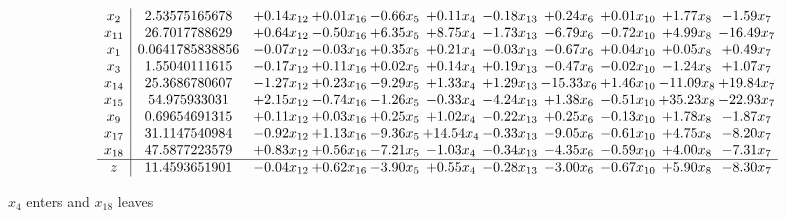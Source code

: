 \documentclass[9pt]{article}
\begin{document}
 \[\begin{array}{c| c c@{\hskip 2pt} c@{\hskip 2pt} c@{\hskip 2pt} c@{\hskip 2pt} c@{\hskip 2pt} c@{\hskip 2pt} c@{\hskip 2pt} c@{\hskip 2pt} c@{\hskip 2pt} }
 x_{2}   &  2.53575165678 & +  0.14 x_{12} & +  0.01 x_{16} & -0.66 x_{5} & +  0.11 x_{4} & -0.18 x_{13} & +  0.24 x_{6} & +  0.01 x_{10} & +  1.77 x_{8} & -1.59 x_{7}\\
 x_{11}   &  26.7017788629 & +  0.64 x_{12} & -0.50 x_{16} & +  6.35 x_{5} & +  8.75 x_{4} & -1.73 x_{13} & -6.79 x_{6} & -0.72 x_{10} & +  4.99 x_{8} & -16.49 x_{7}\\
 x_{1}   &  0.0641785838856 & -0.07 x_{12} & -0.03 x_{16} & +  0.35 x_{5} & +  0.21 x_{4} & -0.03 x_{13} & -0.67 x_{6} & +  0.04 x_{10} & +  0.05 x_{8} & +  0.49 x_{7}\\
 x_{3}   &  1.55040111615 & -0.17 x_{12} & +  0.11 x_{16} & +  0.02 x_{5} & +  0.14 x_{4} & +  0.19 x_{13} & -0.47 x_{6} & -0.02 x_{10} & -1.24 x_{8} & +  1.07 x_{7}\\
 x_{14}   &  25.3686780607 & -1.27 x_{12} & +  0.23 x_{16} & -9.29 x_{5} & +  1.33 x_{4} & +  1.29 x_{13} & -15.33 x_{6} & +  1.46 x_{10} & -11.09 x_{8} & + 19.84 x_{7}\\
 x_{15}   &  54.975933031 & +  2.15 x_{12} & -0.74 x_{16} & -1.26 x_{5} & -0.33 x_{4} & -4.24 x_{13} & +  1.38 x_{6} & -0.51 x_{10} & + 35.23 x_{8} & -22.93 x_{7}\\
 x_{9}   &  0.69654691315 & +  0.11 x_{12} & +  0.03 x_{16} & +  0.25 x_{5} & +  1.02 x_{4} & -0.22 x_{13} & +  0.25 x_{6} & -0.13 x_{10} & +  1.78 x_{8} & -1.87 x_{7}\\
 x_{17}   &  31.1147540984 & -0.92 x_{12} & +  1.13 x_{16} & -9.36 x_{5} & + 14.54 x_{4} & -0.33 x_{13} & -9.05 x_{6} & -0.61 x_{10} & +  4.75 x_{8} & -8.20 x_{7}\\
 x_{18}   &  47.5877223579 & +  0.83 x_{12} & +  0.56 x_{16} & -7.21 x_{5} & -1.03 x_{4} & -0.34 x_{13} & -4.35 x_{6} & -0.59 x_{10} & +  4.00 x_{8} & -7.31 x_{7}\\
\hline
z    &  11.4593651901 & -0.04 x_{12} & +  0.62 x_{16} & -3.90 x_{5} & +  0.55 x_{4} & -0.28 x_{13} & -3.00 x_{6} & -0.67 x_{10} & +  5.90 x_{8} & -8.30 x_{7}\\
\end{array}\]


 $ x_{4} $ enters and $ x_{18} $ leaves 
\end{document}
